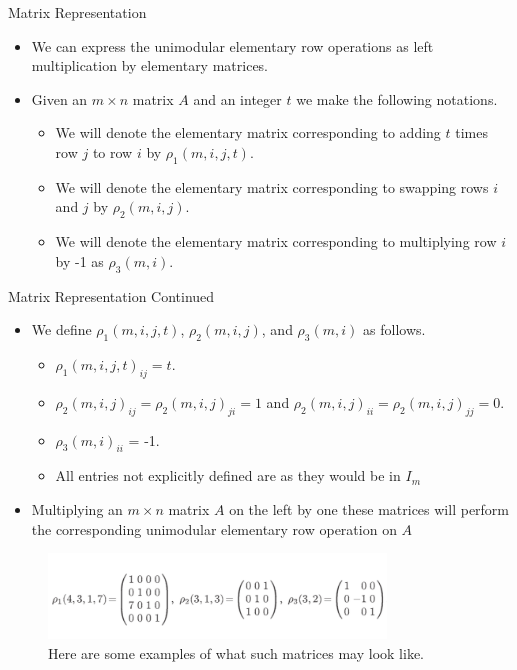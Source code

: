 \documentclass{beamer}
\begin{document}
\begin{frame}{Matrix Representation}
    \begin{itemize}
        \item We can express the unimodular elementary row operations as left multiplication by elementary matrices.
        \item Given an $m \times n$ matrix $A$ and an integer $t$ we make the following notations.
        \begin{itemize}
            \item We will denote the elementary matrix corresponding to adding $t$ times row $j$ to row $i$ by $\rho_1(m, i, j, t)$.
            \item We will denote the elementary matrix corresponding to swapping rows $i$ and $j$ by $\rho_2(m, i, j)$.
            \item We will denote the elementary matrix corresponding to multiplying row $i$ by -1 as $\rho_3(m, i)$.
        \end{itemize}
    \end{itemize}
\end{frame}
\begin{frame}{Matrix Representation Continued}
    \begin{itemize}
        \item We define $\rho_1(m, i, j, t)$, $\rho_2(m, i, j)$, and $\rho_3(m, i)$ as follows.
        \begin{itemize}
            \item $\rho_1(m, i, j, t)_{ij} = t$.
            \item $\rho_2(m, i, j)_{ij} = \rho_2(m, i, j)_{ji} = 1$ and $\rho_2(m, i, j)_{ii} = \rho_2(m, i, j)_{jj} = 0$.
            \item $\rho_3(m, i)_{ii}$ = -1.
            \item All entries not explicitly defined are as they would be in $I_m$
        \end{itemize}
        \item Multiplying an $m \times n$ matrix $A$ on the left by one these matrices will perform the corresponding unimodular elementary row operation on $A$
    \end{itemize}
    \begin{figure}
            \centering
            \includegraphics[width=0.8\textwidth]{UnimodularElementaryRowOperationsExample.png}
            \caption{Here are some examples of what such matrices may look like. \cite{holt2005handbook}}
        \end{figure}
\end{frame}
\end{document}
